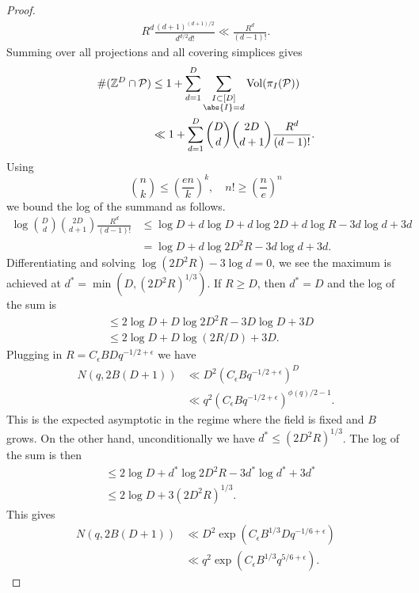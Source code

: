\documentclass{article}
\newcommand{\bZ}{\mathbb{Z}}
\def\cP{{\mathcal P}}
\begin{document}
\begin{proof}
\begin{align*}
R^d \frac{(d+1)^{(d+1)/2}}{d^{d/2} d!}
\ll
\frac{R^d}{(d-1)!}.
\end{align*}
Summing over all projections and all covering simplices gives
\begin{align*}
    \#(\bZ^D \cap \cP)
    &\leq
    1 + \sum_{d=1}^D
    \sum_{\substack{I \subset [D] \\ \abs{I} = d}}
    \operatorname{Vol}(\pi_I(\cP))
    \\
    &\ll
    1 + \sum_{d=1}^D
    \binom{D}{d} \binom{2D}{d+1}
    \frac{R^d}{(d-1)!}.
\end{align*}
Using \[
\binom{n}{k} \leq \left(\frac{en}{k} \right)^k,
\quad
n! \geq \left( \frac{n}{e} \right)^n
\]
we bound the log of the summand as follows.
\begin{align*}
\log \binom{D}{d} \binom{2D}{d+1}
    \frac{R^d}{(d-1)!} & \leq \log D + d \log D + d \log 2 D + d \log R - 3 d \log d + 3d
\\
&= \log D + d \log 2D^2R - 3 d \log d  + 3d.
\end{align*}
Differentiating and solving $\log(2D^2R) - 3 \log d = 0$, we see the maximum is achieved at $d^* = \min(D, (2D^2 R)^{1/3})$. If $R \geq D$, then $d^* = D$ and the log of the sum is
\begin{align*}
    &\leq 2\log D + D \log 2D^2 R - 3 D \log D + 3 D
    \\
    &\leq 2\log D + D \log (2R/D) + 3 D.
\end{align*}
Plugging in $R = C_\epsilon B D q^{-1/2+\epsilon}$ we have
\begin{align*}
N(q,2B(D+1)) &\ll  D^2 \left(C_\epsilon B q^{-1/2+\epsilon}\right)^D
\\
&\ll q^2 \left(C_\epsilon B q^{-1/2+\epsilon}\right)^{\phi(q)/2-1}.
\end{align*}
This is the expected asymptotic in the regime where the field is fixed and $B$ grows. On the other hand, unconditionally we have $d^* \leq (2D^2 R)^{1/3}$. The log of the sum is then
\begin{align*}
    &\leq 2\log D + d^* \log 2D^2R - 3 d^* \log d^*  + 3d^*
    \\
    &\leq 2\log D + 3(2D^2 R)^{1/3}.
\end{align*}
This gives
\begin{align*}
N(q,2B(D+1)) &\ll D^2 \exp \left( C_\epsilon B^{1/3} D q^{-1/6+\epsilon} \right)
\\
&\ll q^2 \exp \left( C_\epsilon B^{1/3} q^{5/6+\epsilon} \right).
\end{align*}

\end{proof}
\end{document}
